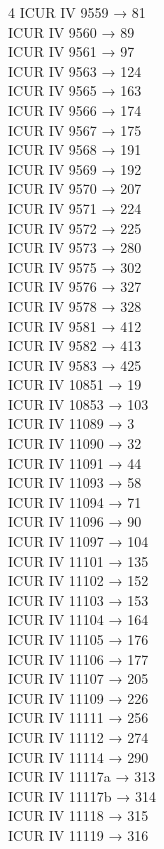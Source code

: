 \begin{multicols}{4}
ICUR IV 9559 → 81\\
ICUR IV 9560 → 89\\
ICUR IV 9561 → 97\\
ICUR IV 9563 → 124\\
ICUR IV 9565 → 163\\
ICUR IV 9566 → 174\\
ICUR IV 9567 → 175\\
ICUR IV 9568 → 191\\
ICUR IV 9569 → 192\\
ICUR IV 9570 → 207\\
ICUR IV 9571 → 224\\
ICUR IV 9572 → 225\\
ICUR IV 9573 → 280\\
ICUR IV 9575 → 302\\
ICUR IV 9576 → 327\\
ICUR IV 9578 → 328\\
ICUR IV 9581 → 412\\
ICUR IV 9582 → 413\\
ICUR IV 9583 → 425\\
ICUR IV 10851 → 19\\
ICUR IV 10853 → 103\\
ICUR IV 11089 → 3\\
ICUR IV 11090 → 32\\
ICUR IV 11091 → 44\\
ICUR IV 11093 → 58\\
ICUR IV 11094 → 71\\
ICUR IV 11096 → 90\\
ICUR IV 11097 → 104\\
ICUR IV 11101 → 135\\
ICUR IV 11102 → 152\\
ICUR IV 11103 → 153\\
ICUR IV 11104 → 164\\
ICUR IV 11105 → 176\\
ICUR IV 11106 → 177\\
ICUR IV 11107 → 205\\
ICUR IV 11109 → 226\\
ICUR IV 11111 → 256\\
ICUR IV 11112 → 274\\
ICUR IV 11114 → 290\\
ICUR IV 11117a → 313\\
ICUR IV 11117b → 314\\
ICUR IV 11118 → 315\\
ICUR IV 11119 → 316\\

\end{multicols}
